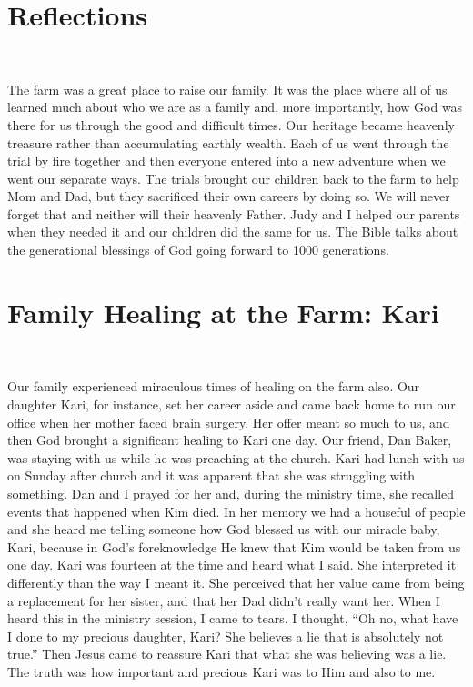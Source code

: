 \documentclass[twoside, 12pt]{book}
\begin{document}
\section{Reflections}
\

The farm was a great place to raise our family. It was the place where all of us learned much about who we are as a family and, more importantly, how God was there for us through the good and difficult times. Our heritage became heavenly treasure rather than accumulating earthly wealth. Each of us went through the trial by fire together and then everyone entered into a new adventure when we went our separate ways. The trials brought our children back to the farm to help Mom and Dad, but they sacrificed their own careers by doing so. We will never forget that and neither will their heavenly Father. Judy and I helped our parents when they needed it and our children did the same for us. The Bible talks about the generational blessings of God going forward to 1000 generations.


\section{Family Healing at the Farm: Kari}
\

Our family experienced miraculous times of healing on the farm also. Our daughter Kari, for instance, set her career aside and came back home to run our office when her mother faced brain surgery. Her offer meant so much to us, and then God brought a significant healing to Kari one day. Our friend, Dan Baker, was staying with us while he was preaching at the church. Kari had lunch with us on Sunday after church and it was apparent that she was struggling with something. Dan and I prayed for her and, during the ministry time, she recalled events that happened when Kim died. In her memory we had a houseful of people and she heard me telling someone how God blessed us with our miracle baby, Kari, because in God’s foreknowledge He knew that Kim would be taken from us one day. Kari was fourteen at the time and heard what I said. She interpreted it differently than the way I meant it. She perceived that her value came from being a replacement for her sister, and that her Dad didn’t really want her. When I heard this in the ministry session, I came to tears. I thought, “Oh no, what have I done to my precious daughter, Kari? She believes a lie that is absolutely not true.” Then Jesus came to reassure Kari that what she was believing was a lie. The truth was how important and precious Kari was to Him and also to me. 
\end{document}
